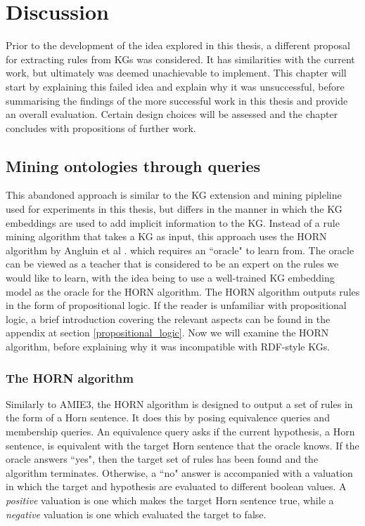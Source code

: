 \chapter{Discussion}
Prior to the development of the idea explored in this thesis, a different proposal for extracting rules from KGs was considered. It has similarities with the current work, but ultimately was deemed unachievable to implement. This chapter will start by explaining this failed idea and explain why it was unsuccessful, before summarising the findings of the more successful work in this thesis and provide an overall evaluation. Certain design choices will be assessed and the chapter concludes with propositions of further work.

\section{Mining ontologies through queries}
This abandoned approach is similar to the KG extension and mining pipleline used for experiments in this thesis, but differs in the manner in which the KG embeddings are used to add implicit information to the KG. Instead of a rule mining algorithm that takes a KG as input, this approach uses the HORN algorithm by Angluin et al \cite{DBLP:journals/ml/AngluinFP92}. which requires an ``oracle" to learn from. The oracle can be viewed as a teacher that is considered to be an expert on the rules we would like to learn, with the idea being to use a well-trained KG embedding model as the oracle for the HORN algorithm. The HORN algorithm outputs rules in the form of propositional logic. If the reader is unfamiliar with propositional logic, a brief introduction covering the relevant aspects can be found in the appendix at section \ref{propositional_logic}. Now we will examine the HORN algorithm, before explaining why it was incompatible with RDF-style KGs.

\subsection{The HORN algorithm}
Similarly to AMIE3, the HORN algorithm is designed to output a set of rules in the form of a Horn sentence. It does this by posing equivalence queries and membership queries. An equivalence query asks if the current hypothesis, a Horn sentence, is equivalent with the target Horn sentence that the oracle knows. If the oracle answers ``yes", then the target set of rules has been found and the algorithm terminates. Otherwise, a ``no" answer is accompanied with a valuation in which the target and hypothesis are evaluated to different boolean values. A \textit{positive} valuation is one which makes the target Horn sentence true, while a \textit{negative} valuation is one which evaluated the target to false. %

